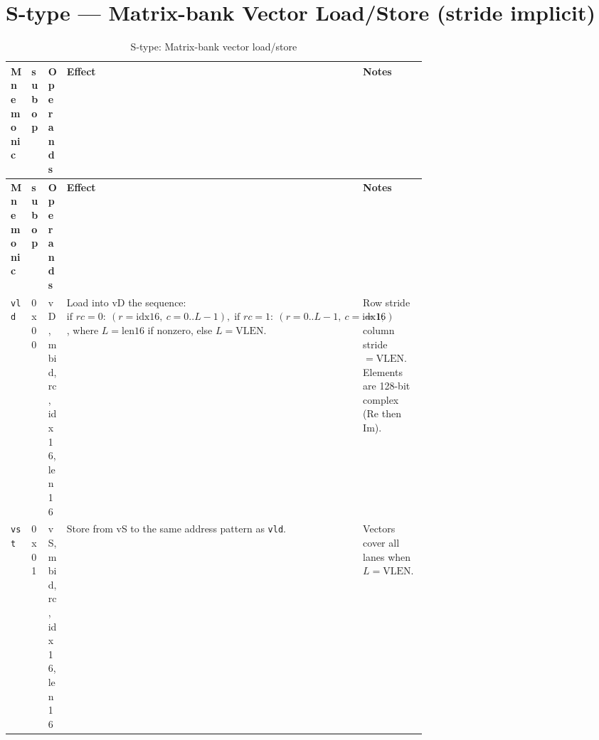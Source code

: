 \documentclass[10pt]{article}
\begin{document}
\section*{S-type — Matrix-bank Vector Load/Store (stride implicit)}
\begin{longtable}{@{}l l l L{0.38\linewidth} L{0.30\linewidth}@{}}
\caption{S-type: Matrix-bank vector load/store}\label{tab:stype}\\
\toprule
\textbf{Mnemonic} & \textbf{subop} & \textbf{Operands} & \textbf{Effect} & \textbf{Notes} \\
\midrule
\endfirsthead
\toprule
\textbf{Mnemonic} & \textbf{subop} & \textbf{Operands} & \textbf{Effect} & \textbf{Notes} \\
\midrule
\endhead
\texttt{vld} & 0x00 & vD, mbid, rc, idx16, len16 &
Load into vD the sequence:
$\text{if } rc{=}0:\ (r{=}\text{idx16},\ c{=}0..L{-}1),\;
\text{if } rc{=}1:\ (r{=}0..L{-}1,\ c{=}\text{idx16})$,
where $L = \text{len16}$ if nonzero, else $L=\mathrm{VLEN}$. &
Row stride $=1$;\; column stride $=\mathrm{VLEN}$. Elements are 128-bit complex (Re then Im). \\
\addlinespace[0.25em]
\texttt{vst} & 0x01 & vS, mbid, rc, idx16, len16 &
Store from vS to the same address pattern as \texttt{vld}. &
Vectors cover all lanes when $L{=}\mathrm{VLEN}$. \\
\bottomrule
\end{longtable}
\end{document}
